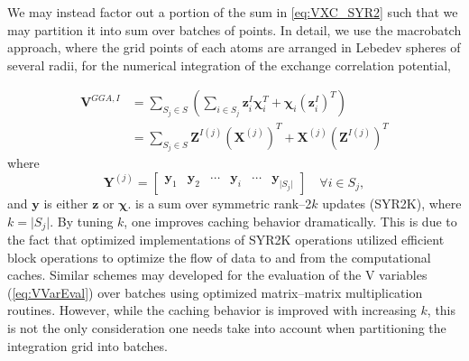 We may instead factor out a portion of the sum in \cref{eq:VXC_SYR2} such that we may partition it into sum over batches of points.
In detail, we use the macrobatch approach,\cite{Frisch96_213} where the grid points of each atoms are arranged in Lebedev spheres\cite{Lebedev77_99}  of several radii, for the numerical integration of the exchange correlation potential,

\begin{align}
\label{eq:VXC_SYR2K}
\mathbf{V}^{GGA,I} &= \sum_{S_j \in S} \left(\sum_{i\in S_j} \mathbf{z}^I_i \boldsymbol{\chi}_i^T + \boldsymbol{\chi}_i \left(\mathbf{z}^I_i\right)^T \right) \nonumber \\
&= \sum_{S_j \in S} \mathbf{Z}^{I(j)} \left(\mathbf{X}^{(j)}\right)^T + \mathbf{X}^{(j)} \left(\mathbf{Z}^{I(j)}\right)^T
\end{align}
where
\begin{equation}
\mathbf{Y}^{(j)} = \begin{bmatrix} \mathbf{y}_1 & \mathbf{y}_{2} & \cdots & \mathbf{y}_i & \cdots &\mathbf{y}_{\vert S_j \vert} \end{bmatrix} \quad \forall i\in S_j,
\end{equation}
and $\mathbf{y}$ is either $\mathbf{z}$ or $\boldsymbol{\chi}$.  is a sum over symmetric rank--2$k$ updates (SYR2K), where $k = \vert S_j \vert$. By tuning
$k$, one improves caching behavior dramatically. This is due to the fact that optimized implementations of SYR2K operations utilized efficient block
operations to optimize the flow of data to and from the computational caches. 
 Similar schemes may
developed for the evaluation of the V variables (\cref{eq:VVarEval}) over batches using optimized matrix--matrix multiplication routines. However, while the caching behavior
is improved with increasing $k$, this is not the only consideration one needs take into account when partitioning the integration grid into batches.

